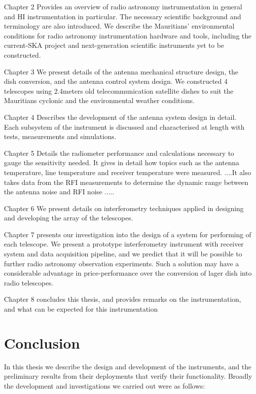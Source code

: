 {Chapter 2 Provides an overview of radio astronomy instrumentation in general and HI instrumentation in particular. The necessary scientific background and terminology are also introduced. We describe the Mauritians' environmental conditions for radio astronomy instrumentation hardware and tools, including the current-SKA project and next-generation scientific instruments yet to be constructed.

Chapter 3 We present details of the antenna mechanical structure design, the dish conversion, and the antenna control system design. We constructed 4 telescopes using 2.4meters old telecommunication satellite dishes to suit the Mauritians cyclonic and the environmental weather conditions.


Chapter 4 Describes the development of the antenna system design in detail. Each subsystem of the instrument is discussed and characterised at length with tests, measurements and simulations.


Chapter 5 Details the radiometer performance and calculations necessary to gauge the sensitivity needed. It gives in detail how topics such as the antenna temperature, line temperature
and receiver temperature were measured. 
....It also takes data from the RFI measurements to determine the dynamic range between the antenna noise and RFI noise .....


Chapter 6 We present details on interferometry techniques applied in designing and developing the array of the telescopes.

Chapter 7 presents our investigation into the design of a system for performing
 of each telescope. We present a prototype interferometry instrument with receiver system and data acquisition pipeline, and
we predict that it will be possible to further radio astronomy observation experiments. Such a solution may have a considerable advantage
in price-performance over the conversion of lager dish into radio telescopes.

Chapter 8 concludes this thesis, and provides remarks on the instrumentation, and what can be expected for this instrumentation


\section{Conclusion}

In this thesis we describe the design and development of the instruments, and the preliminary results from their deployments that verify their functionality. Broadly
the development and investigations we carried out were as follows:


}
